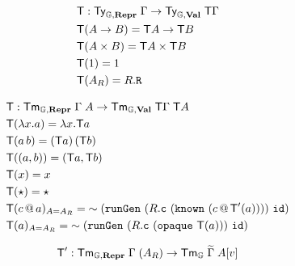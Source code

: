 \begin{align*}
   & {\textsf{T}}            : {\textsf{Ty}}_{{\mathbb{G}}, \textbf{Repr}} \; \Gamma \to {\textsf{Ty}}_{{\mathbb{G}}, \textbf{Val}}\; {\textsf{T}}\Gamma \\
   & {\textsf{T}}(A \to B)  = {\textsf{T}} A \to {\textsf{T}} B                                           \\
   & {\textsf{T}}(A \times B) = {\textsf{T}} A \times {\textsf{T}} B                                      \\
   & {\textsf{T}}(1) = 1                                                                      \\
   & {\textsf{T}}(A_R) = R.\texttt{R}
\end{align*}

\begin{align*}
   & \fun T            : \Tm_{\catG, \mR} \; \Gamma \; A \to \Tm_{\catG, \mV}\; \fun T\Gamma \; \fun T A                           \\
   & \fun T(\lambda x . a)  = \lambda x . \fun T a                                                                                 \\
   & \fun T(a \, b)  = (\fun T a) \, (\fun T b)                                                                                    \\
   & \fun T((a, b)) = (\fun T a, \fun T b)                                                                                         \\
   & \fun T(x) = x                                                                                                                 \\
   & \fun T(\star) = \star                                                                                                         \\
   & \fun T(c \,@\, a)_{A = A_R} = \splice{(\defin{runGen} \ (R.\defin{c} \ (\defin{known}\ (c \,@\, \fun T'(a)))) \  \defin{id})} \\
   & \fun T(a)_{A = A_R} = \splice{(\defin{runGen} \ (R.\defin{c} \ (\defin{opaque}\ \fun T(a))) \  \defin{id})}
\end{align*}

\begin{align*}
   & {\textsf{T}}'            : {\textsf{Tm}}_{{\mathbb{G}}, \textbf{Repr}} \; \Gamma \; (A_R) \to {\textsf{Tm}}_{{\mathbb{G}}}\; \widetilde{\Gamma} \; A[v] \\
\end{align*}

